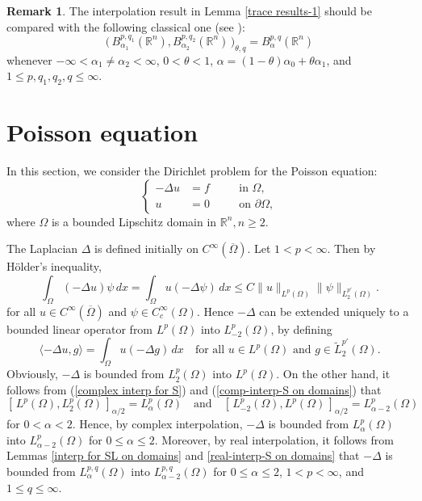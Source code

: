 \documentclass[reqno,centertags,11pt]{amsart}
\theoremstyle{definition}
\newtheorem{rmk}[thm]{Remark}
\numberwithin{thm}{section}
\numberwithin{equation}{section}
\newcommand{\R}{{\mathbb{R}}}
\begin{document}
\begin{rmk}
The interpolation result  in Lemma  \ref{trace results-1} should be compared with    the following classical  one (see  \cite[(2.15)]{JK}):
$$
\big(\,B^{p,q_1}_{\alpha_1}(\R^n),B^{p,q_2}_{\alpha_2}(\R^n)\,\big)_{\theta,q}= B^{p,q}_{\alpha}(\R^n)
$$
whenever $-\infty < \alpha_1\neq \alpha_2 < \infty$, $0<\theta<1$, $\alpha=(1-\theta)\alpha_0+\theta\alpha_1$, and $1\le p,q_1,q_2,q\le \infty$.
\end{rmk}





\section{Poisson equation}

In this section, we consider the   Dirichlet problem for the Poisson equation:
\begin{equation}\label{eq:D-1}
\left\{\begin{alignedat}{2}
- \Delta u  & =f & \quad & \text{in }\Omega,\\
  u & =0 & \quad & \text{on }\partial\Omega ,
\end{alignedat}\right.
\end{equation}
where $\Omega$ is a bounded Lipschitz domain in $\R^n , n \ge 2$.




The  Laplacian $\Delta$ is defined initially on $C^\infty(\overline{\Omega})$.
Let $1<p<\infty$. Then by H\"{o}lder's inequality,
\[
\int_\Omega (-\Delta u) \psi \,d x = \int_\Omega u (-\Delta \psi )  \,d x \le C \|u\|_{L^{p} (\Omega )}\|\psi \|_{L_2^{p'}(\Omega )}.
\]
for all $u\in C^\infty(\overline{\Omega})$ and $\psi \in C_c^\infty (\Omega )$. Hence  $-\Delta$ can be extended  uniquely to a bounded linear operator from $L^{p}(\Omega )$ into $L_{-2}^{p}(\Omega )$, by defining
\[
\langle -\Delta u , g \rangle = \int_\Omega u (-\Delta g )  \,d x \quad\mbox{for all}\,\, u \in L^{p}(\Omega )\,\,\mbox{and}\,\, g \in \widetilde{L}_{2}^{p'}(\Omega ).
\]
Obviously, $-\Delta$ is bounded from $L_2^p (\Omega )$ into $L^p (\Omega )$.
On the other hand, it  follows from  (\ref{complex interp for S}) and (\ref{comp-interp-S on domains})  that
$$
\left[ \, L^{p} (\Omega ) , L_2^{p} (\Omega)  \,\right]_{\alpha /2} = L_{\alpha}^{p}(\Omega ) \quad\mbox{and}\quad \left[ \, L_{  -2}^{p} (\Omega ) , L^{p} (\Omega)  \,\right]_{\alpha /2} =L_{\alpha-2}^p (\Omega )
$$
for $0<\alpha<2$. Hence,  by complex interpolation,  $-\Delta$ is bounded from $L_{\alpha}^{p}(\Omega )$ into $L_{\alpha-2}^p (\Omega )$ for   $0 \le \alpha \le   2$. Moreover, by real interpolation, it follows from Lemmas \ref{interp for SL on domains} and \ref{real-interp-S on domains} that $-\Delta$ is bounded from $L_{\alpha}^{p,q}(\Omega )$ into $L_{\alpha-2}^{p,q} (\Omega )$ for   $0 \le \alpha \le   2$, $1<p<\infty$, and $1 \le q\le \infty$.
\end{document}
